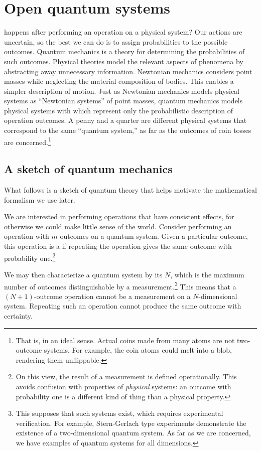 \documentclass[../thesis.tex]{subfiles}
\begin{document}
\chapter{Open quantum systems}\label{ch:open-quantum-systems}

 happens after performing an operation on a physical system?
Our actions are uncertain, so the best we can do is to assign probabilities to
the possible outcomes. Quantum mechanics is a theory for determining the
probabilities of such outcomes. Physical theories model the relevant aspects of
phenomena by abstracting away unnecessary information. Newtonian mechanics
considers point masses while neglecting the material composition of bodies. This
enables a simpler description of motion. Just as Newtonian mechanics models
physical systems as ``Newtonian systems'' of point masses, quantum mechanics
models physical systems with  which
represent only the probabilistic description of operation outcomes. A penny and
a quarter are different physical systems that correspond to the same ``quantum
system{,}'' as far as the outcomes of coin tosses are concerned.\footnote{%
  That is, in an ideal sense. Actual coins made from many atoms are not
  two-outcome systems. For example, the coin atoms could melt into a blob,
  rendering them unflippable.
}

\section{A sketch of quantum mechanics}

What follows is a sketch of quantum theory that helps motivate the mathematical
formalism we use later.

We are interested in performing operations that have consistent effects, for
otherwise we could make little sense of the world. Consider performing an
operation with $m$ outcomes on a quantum system. Given a particular outcome,
this operation is a  if repeating the operation gives the same
outcome with probability one.\footnote{%
  On this view, the result of a measurement is defined operationally. This
  avoids confusion with properties of \emph{physical} systems: an outcome with
  probability one is a different kind of thing than a physical property.
}

We may then characterize a quantum system by its  $N$, which is
the maximum number of outcomes distinguishable by a measurement.\footnote{%
  This supposes that such systems exist, which requires experimental
  verification. For example, Stern-Gerlach type experiments demonstrate the
  existence of a two-dimensional quantum system. As far as we are concerned, we
  have examples of quantum systems for all dimensions.
}
This means that a $(N+1)$-outcome operation cannot be a measurement on a
$N$-dimensional system. Repeating such an operation cannot produce the same
outcome with certainty.
\end{document}
